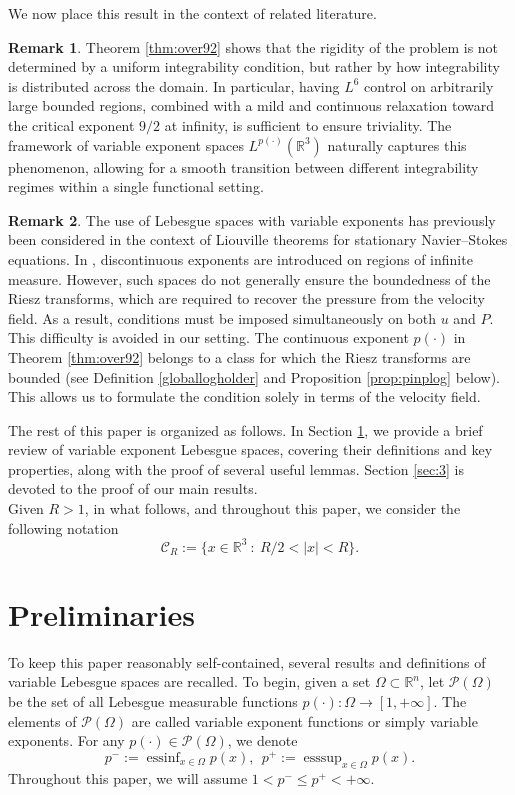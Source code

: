 \documentclass[a4paper,12pt]{amsart}
\theoremstyle{definition}
\newtheorem{remark}{Remark}[section]
\theoremstyle{plain}
\begin{document}
\noindent We now place this result in the context of related literature.
\begin{remark}
Theorem \ref{thm:over92} shows that the rigidity of the problem is not determined by a uniform integrability condition, but rather by how integrability is distributed across the domain. In particular, having $L^6$ control on arbitrarily large bounded regions, combined with a mild and continuous relaxation toward the critical exponent $9/2$ at infinity, is sufficient to ensure triviality. 
The framework of variable exponent spaces $L^{p(\cdot)}(\mathbb{R}^3)$ naturally captures this phenomenon, allowing for a smooth transition between different integrability regimes within a single functional setting.
\end{remark} 
  



 
 \begin{remark}
The use of Lebesgue spaces with variable exponents has previously been
considered in the context of Liouville theorems for stationary
Navier--Stokes equations. In \cite{CV2023}, discontinuous exponents are
introduced on regions of infinite measure. However, such spaces do not
generally ensure the boundedness of the Riesz transforms, which are
required to recover the pressure from the velocity field. As a result,
conditions must be imposed simultaneously on both $u$ and $P$.
This difficulty is avoided in our setting. The continuous exponent
$p(\cdot)$ in Theorem \ref{thm:over92} belongs to a class for which the
Riesz transforms are bounded (see Definition \ref{globallogholder} and
Proposition \ref{prop:pinplog} below). This allows us to formulate the
condition solely in terms of the velocity field.
\end{remark} 

The rest of this paper is organized as follows. In Section \ref{sect:2}, we provide a brief review of variable exponent Lebesgue spaces, covering their definitions and key properties, along with the proof of several useful lemmas. Section \ref{sec:3} is devoted to the proof of our main results. \\

Given $R>1$, in what follows, and throughout this paper, we consider the following notation
\[
\mathcal{C}_R := \{ x \in \mathbb{R}^3 \ : \ R/2 < |x| < R \}.
\]

%
\section{Preliminaries}\label{sect:2}
%
To keep this paper reasonably self-contained, several results and definitions of variable Lebesgue spaces are recalled. To begin,  given a set $\Omega\subset\mathbb{R}^{n}$, let $\mathcal{P}(\Omega)$ be the set of all Lebesgue measurable functions $p(\cdot):\Omega\rightarrow[1,+\infty]$.  The elements of $\mathcal{P}(\Omega)$ are called variable exponent functions or simply variable exponents. For any $p(\cdot)\in \mathcal{P}(\Omega)$, we denote
$$
 p^{-}:=\operatorname{essinf}_{x\in\Omega}p(x), \ \  p^{+}:=\operatorname{esssup}_{x\in\Omega}p(x).
$$
Throughout this paper, we will assume  $1<p^-\leq p^+<+\infty$.\\
\end{document}
